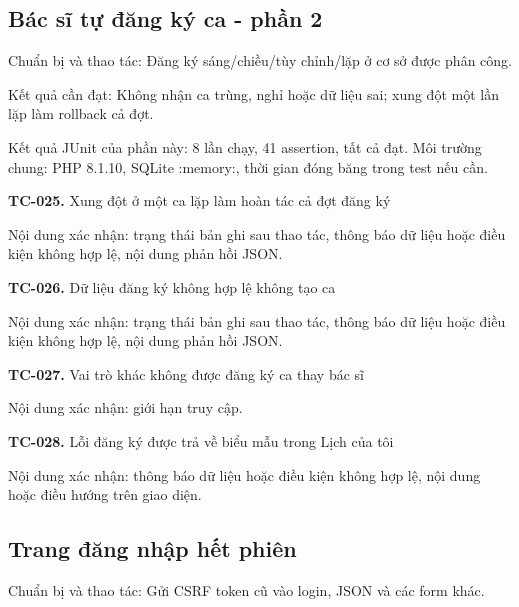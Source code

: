 \par\vspace{8pt}

\subsection{Bác sĩ tự đăng ký ca - phần 2}
Chuẩn bị và thao tác:\allowbreak{} Đăng ký sáng/\allowbreak{}chiều/\allowbreak{}tùy chỉnh/\allowbreak{}lặp ở cơ sở được phân công.\allowbreak{}

Kết quả cần đạt:\allowbreak{} Không nhận ca trùng, nghỉ hoặc dữ liệu sai; xung đột một lần lặp làm rollback cả đợt.\allowbreak{}

Kết quả JUnit của phần này:\allowbreak{} 8 lần chạy, 41 assertion, tất cả đạt.\allowbreak{} Môi trường chung:\allowbreak{} PHP 8.\allowbreak{}1.\allowbreak{}10, SQLite :\allowbreak{}memory:\allowbreak{}, thời gian đóng băng trong test nếu cần.\allowbreak{}

\noindent\textbf{TC-025.} Xung đột ở một ca lặp làm hoàn tác cả đợt đăng ký\par
Nội dung xác nhận:\allowbreak{} trạng thái bản ghi sau thao tác, thông báo dữ liệu hoặc điều kiện không hợp lệ, nội dung phản hồi JSON.\allowbreak{}

\noindent\textbf{TC-026.} Dữ liệu đăng ký không hợp lệ không tạo ca\par
Nội dung xác nhận:\allowbreak{} trạng thái bản ghi sau thao tác, thông báo dữ liệu hoặc điều kiện không hợp lệ, nội dung phản hồi JSON.\allowbreak{}

\noindent\textbf{TC-027.} Vai trò khác không được đăng ký ca thay bác sĩ\par
Nội dung xác nhận:\allowbreak{} giới hạn truy cập.\allowbreak{}

\noindent\textbf{TC-028.} Lỗi đăng ký được trả về biểu mẫu trong Lịch của tôi\par
Nội dung xác nhận:\allowbreak{} thông báo dữ liệu hoặc điều kiện không hợp lệ, nội dung hoặc điều hướng trên giao diện.\allowbreak{}


\par\vspace{8pt}

\subsection{Trang đăng nhập hết phiên}
Chuẩn bị và thao tác:\allowbreak{} Gửi CSRF token cũ vào login, JSON và các form khác.\allowbreak{}

